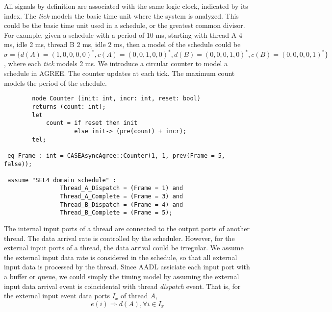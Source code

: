 All signals by definition are associated with the same logic clock, indicated by its index. The \emph{tick} models the basic time unit where the system is analyzed. This could be the basic time unit used in a schedule, or the greatest common divisor. For example, given a schedule with a period of 10 ms, starting with thread A 4 ms, idle 2 ms, thread B 2 ms, idle 2 ms, then a model of the schedule could be $\sigma = \{d(A)=(1,0,0,0,0)^*, c(A) = (0,0,1,0,0)^*, d(B) = (0,0,0,1,0)^*, c(B) = (0,0,0,0,1)^*\}$, where each \emph{tick} models 2 ms. We introduce a circular counter to model a schedule in AGREE. The counter updates at each tick. The maximum count models the period of the schedule. 
\begin{verbatim}
		node Counter (init: int, incr: int, reset: bool)	
		returns (count: int);
		let
			count = if reset then init
					else init-> (pre(count) + incr);
		tel;
		
 eq Frame : int = CASEAsyncAgree::Counter(1, 1, prev(Frame = 5, false));

 assume "SEL4 domain schedule" :
				Thread_A_Dispatch = (Frame = 1) and
				Thread_A_Complete = (Frame = 3) and					
				Thread_B_Dispatch = (Frame = 4) and	
				Thread_B_Complete = (Frame = 5);	
\end{verbatim}		

The internal input ports of a thread are connected to the output ports of another thread. The data arrival rate is controlled by the scheduler. However, for the external input ports of a thread, the data arrival could be irregular. We assume the external input data rate is considered in the schedule, so that all external input data is processed by the thread. Since AADL assiciate each input port with a buffer or queue, we could simply the timing model by assuming the external input data arrival event is coincidental with thread \emph{dispatch} event. That is, for the external input event data ports $I_x$ of thread $A$, 
$$ e(i) \Rightarrow d(A), \forall i \in I_x $$
	



